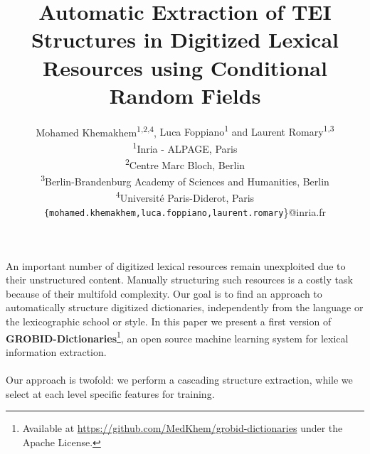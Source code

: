 \documentclass[twocolumn,a4paper]{article}
\newcommand*{\affaddr}[1]{#1} %
\newcommand*{\affmark}[1][*]{\textsuperscript{#1}}
\newcommand*{\email}[1]{\texttt{#1}}
\begin{document}
\title{Automatic Extraction of TEI Structures in Digitized Lexical Resources using Conditional Random Fields}  
\author{%
Mohamed Khemakhem\affmark[1,2,4], {Luca Foppiano\affmark[1] and Laurent Romary\affmark[1,3]\\
\affaddr{\affmark[1]Inria - ALPAGE, Paris}\\
\affaddr{\affmark[2]Centre Marc Bloch, Berlin}\\
\affaddr{\affmark[3]Berlin-Brandenburg Academy of Sciences and Humanities, Berlin}\\
\affaddr{\affmark[4]Université Paris-Diderot, Paris}\\

\email{\{mohamed.khemakhem,luca.foppiano,laurent.romary}\}@inria.fr}\\
}
\maketitle


\paragraph{}An important number of digitized lexical resources remain unexploited due to their unstructured content.
Manually structuring such resources is a costly task because of their multifold complexity. 
Our goal is to find an approach to automatically structure digitized dictionaries, independently from the language or the lexicographic school or style. In this paper we present a first version of \textbf{GROBID-Dictionaries}\footnote{Available at \url{https://github.com/MedKhem/grobid-dictionaries} under the Apache License.}, an open source machine learning system for lexical information extraction.
 
\paragraph{} Our approach is twofold: we perform a cascading structure extraction, while we select at each level specific features for training.
\end{document}

